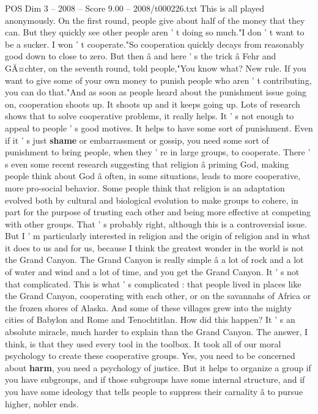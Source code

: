 \begin{textsample}{POS Dim 3 – 2008 – Score 9.00 – 2008/t000226.txt}
This is all played anonymously.
On the first round, people give about half of the money that they can.
But they quickly see other people aren ' t doing so much."I don ' t want to be a sucker.
I won ' t cooperate."So cooperation quickly decays from reasonably good down to close to zero.
But then â and here ' s the trick â Fehr and GĂ¤chter, on the seventh round, told people,"You know what?
New rule.
If you want to give some of your own money to punish people who aren ' t contributing, you can do that."And as soon as people heard about the punishment issue going on, cooperation shoots up.
It shoots up and it keeps going up.
Lots of research shows that to solve cooperative problems, it really helps.
It ' s not enough to appeal to people ' s good motives.
It helps to have some sort of punishment.
Even if it ' s just \textbf{shame} or embarrassment or gossip, you need some sort of punishment to bring people, when they ' re in large groups, to cooperate.
There ' s even some recent research suggesting that religion â priming God, making people think about God â often, in some situations, leads to more cooperative, more pro-social behavior.
Some people think that religion is an adaptation evolved both by cultural and biological evolution to make groups to cohere, in part for the purpose of trusting each other and being more effective at competing with other groups.
That ' s probably right, although this is a controversial issue.
But I ' m particularly interested in religion and the origin of religion and in what it does to us and for us, because I think the greatest wonder in the world is not the Grand Canyon.
The Grand Canyon is really simple â a lot of rock and a lot of water and wind and a lot of time, and you get the Grand Canyon.
It ' s not that complicated.
This is what ' s complicated : that people lived in places like the Grand Canyon, cooperating with each other, or on the savannahs of Africa or the frozen shores of Alaska.
And some of these villages grew into the mighty cities of Babylon and Rome and Tenochtitlan.
How did this happen?
It ' s an absolute miracle, much harder to explain than the Grand Canyon.
The answer, I think, is that they used every tool in the toolbox.
It took all of our moral psychology to create these cooperative groups.
Yes, you need to be concerned about \textbf{harm}, you need a psychology of justice.
But it helps to organize a group if you have subgroups, and if those subgroups have some internal structure, and if you have some ideology that tells people to suppress their carnality â to pursue higher, nobler ends.

\end{textsample}
